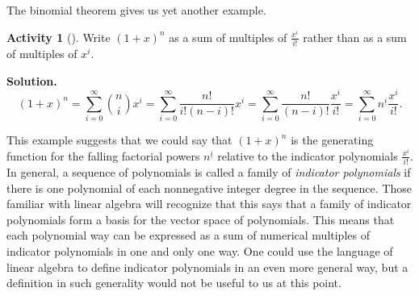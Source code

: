 \documentclass[10pt,]{book}
\theoremstyle{plain}
\theoremstyle{definition}
\newtheorem{activity}[project]{Activity}
\numberwithin{equation}{chapter}
\begin{document}
\par
The binomial theorem gives us yet another example.%
\begin{activity}[]\label{activity-336}
Write \((1+x)^n\) as a sum of multiples of \(\frac{x^i}{i!}\) rather than as a sum of multiples of \(x^i\).%
\par\medskip\noindent%
\textbf{Solution.}\quad %
\begin{equation*}
(1+x)^n =
\sum_{i=0}^\infty \binom{n}{i}x^i=\sum_{i=0}^\infty \frac{n!}{i!(n-i)!}x^i
=
\sum_{i=0}^\infty \frac{n!}{(n-i)!}\frac{x^i}{i!} = \sum_{i=0}^\infty
n^{\underline{i}} \frac{x^i}{i!}.
\end{equation*}
\end{activity}
This example suggests that we could say that \((1+x)^n\) is the generating function for the falling factorial powers \(n^{\underline{i}}\) relative to the indicator polynomials \(\frac{x^i}{i!}\). In general, a sequence of polynomials is called a family of \emph{indicator polynomials} if there is one polynomial of each nonnegative integer degree in the sequence. Those familiar with linear algebra will recognize that this says that a family of indicator polynomials form a basis for the vector space of polynomials. This means that each polynomial way can be expressed as a sum of numerical multiples of indicator polynomials in one and only one way. One could use the language of linear algebra to define indicator polynomials in an even more general way, but a definition in such generality would not be useful to us at this point.%
\typeout{************************************************}
\typeout{************************************************}
\end{document}
